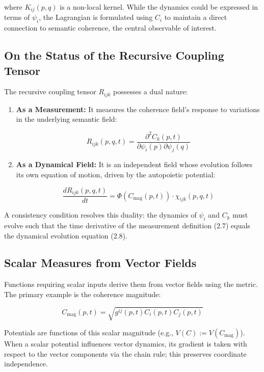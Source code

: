 where \(K_{ij}(p,q)\) is a non-local kernel. While the dynamics could be expressed in terms of \(\psi_i\), the Lagrangian is formulated using \(C_i\) to maintain a direct connection to semantic coherence, the central observable of interest.


\subsection{On the Status of the Recursive Coupling Tensor}
\label{sec:on_the_status_of_the_recursive_coupling_tensor}

The recursive coupling tensor \(R_{ijk}\) possesses a dual nature:

\begin{enumerate}

    \item \textbf{As a Measurement:} It measures the coherence field's response to variations in the underlying semantic field:

    \begin{equation}
    R_{ijk}(p, q, t) = \frac{\partial^2 C_k(p,t)}{\partial \psi_i(p) \partial \psi_j(q)}
    \end{equation}

    \item \textbf{As a Dynamical Field:} It is an independent field whose evolution follows its own equation of motion, driven by the autopoietic potential:

    \begin{equation}
    \frac{dR_{ijk}(p,q,t)}{dt} = \Phi(C_{\mathrm{mag}}(p,t)) \cdot \chi_{ijk}(p,q,t)
    \end{equation}

\end{enumerate}

A consistency condition resolves this duality: the dynamics of \(\psi_i\) and \(C_k\) must evolve such that the time derivative of the measurement definition (2.7) equals the dynamical evolution equation (2.8).


\subsection{Scalar Measures from Vector Fields}
\label{sec:scalar_measures_from_vector_fields}

Functions requiring scalar inputs derive them from vector fields using the metric. The primary example is the coherence magnitude:

\begin{equation}
C_{\mathrm{mag}}(p,t) = \sqrt{g^{ij}(p,t) C_i(p,t) C_j(p,t)}
\end{equation}

Potentials are functions of this scalar magnitude (e.g., \(V(C) := V(C_{\mathrm{mag}})\)). When a scalar potential influences vector dynamics, its gradient is taken with respect to the vector components via the chain rule; this preserves coordinate independence. 